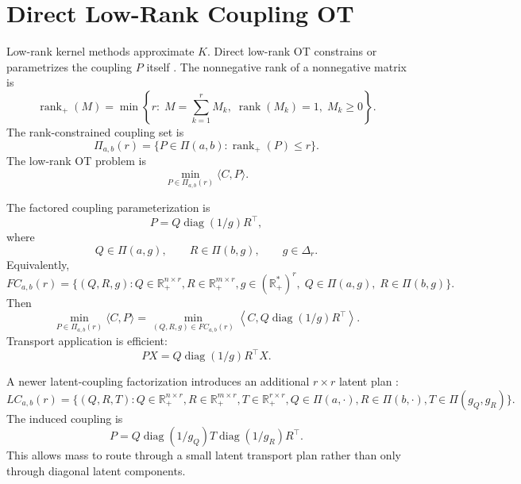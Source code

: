 \documentclass[11pt]{article}
\newcommand{\R}{\mathbb{R}}
\newcommand{\diag}{\operatorname{diag}}
\newcommand{\rankp}{\operatorname{rank}_{+}}
\begin{document}
\section{Direct Low-Rank Coupling OT}

Low-rank kernel methods approximate $K$.  Direct low-rank OT constrains or
parametrizes the coupling $P$ itself
\citep{forrow2019factored,scetbon2021lowrank,scetbon2022lowrank,scetbon2023unbalanced}.
The nonnegative rank of a nonnegative
matrix is
\begin{equation}
\rankp(M)
=
\min\left\{
r:\;M=\sum_{k=1}^r M_k,\;
\operatorname{rank}(M_k)=1,\;M_k\ge0
\right\}.
\label{eq:nonnegative-rank}
\end{equation}
The rank-constrained coupling set is
\begin{equation}
\Pi_{a,b}(r)
=
\{P\in\Pi(a,b):\rankp(P)\le r\}.
\label{eq:low-rank-polytope}
\end{equation}
The low-rank OT problem is
\begin{equation}
\min_{P\in\Pi_{a,b}(r)}\langle C,P\rangle.
\label{eq:low-rank-ot}
\end{equation}

The factored coupling parameterization is
\begin{equation}
P
=
Q\diag(1/g)R^\top,
\label{eq:factored-coupling}
\end{equation}
where
\begin{equation}
Q\in\Pi(a,g),
\qquad
R\in\Pi(b,g),
\qquad
g\in\Delta_r.
\label{eq:factored-coupling-constraints}
\end{equation}
Equivalently,
\begin{equation}
FC_{a,b}(r)
=
\{(Q,R,g): Q\in\R_+^{n\times r},
R\in\R_+^{m\times r},
g\in(\R_+^\ast)^r,\;
Q\in\Pi(a,g),\;R\in\Pi(b,g)\}.
\label{eq:fc-set}
\end{equation}
Then
\begin{equation}
\min_{P\in\Pi_{a,b}(r)}\langle C,P\rangle
=
\min_{(Q,R,g)\in FC_{a,b}(r)}
\left\langle C,Q\diag(1/g)R^\top\right\rangle.
\label{eq:factored-low-rank-objective}
\end{equation}
Transport application is efficient:
\begin{equation}
PX
=
Q\diag(1/g)R^\top X.
\label{eq:factored-transport}
\end{equation}

A newer latent-coupling factorization introduces an additional $r\times r$
latent plan \citep{halmos2024frlc,halmos2025hierarchical}:
\begin{equation}
LC_{a,b}(r)
=
\{(Q,R,T):
Q\in\R_+^{n\times r},
R\in\R_+^{m\times r},
T\in\R_+^{r\times r},
Q\in\Pi(a,\cdot),
R\in\Pi(b,\cdot),
T\in\Pi(g_Q,g_R)
\}.
\label{eq:latent-coupling-set}
\end{equation}
The induced coupling is
\begin{equation}
P
=
Q\diag(1/g_Q)
T
\diag(1/g_R)R^\top.
\label{eq:latent-coupling}
\end{equation}
This allows mass to route through a small latent transport plan rather than
only through diagonal latent components.
\end{document}
